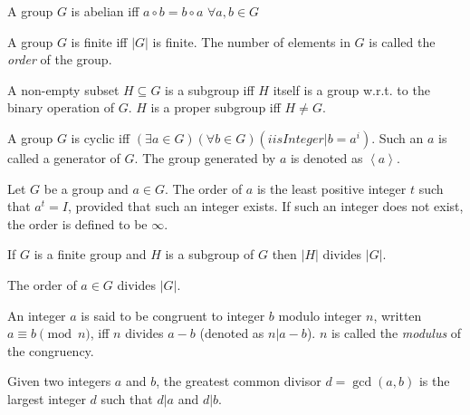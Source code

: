 \begin{defn}
  A group $G$ is abelian iff $a \circ b = b \circ a$ $\forall a,b \in G$
\end{defn}

\begin{defn}
  A group $G$ is finite iff $|G|$ is finite. The number of elements in
  $G$ is called the \emph{order} of the group.
\end{defn}

\begin{defn}[Subgroup]
  A non-empty subset $H \subseteq G$ is a subgroup iff $H$ itself is a
  group w.r.t. to the binary operation of $G$. $H$ is a proper subgroup
  iff $H \neq G$.
\end{defn}

\begin{defn}
  A group $G$ is cyclic iff $(\exists a \in G)(\forall b \in G)(i is
  Integer | b = a^i)$. Such an $a$ is called a generator of $G$. The
  group generated by $a$ is denoted as $\left< a \right>$.
\end{defn}

\begin{defn}[Order]
  Let $G$ be a group and $a \in G$. The order of $a$ is the least
  positive integer $t$ such that $a^t = I$, provided that such an
  integer exists.  If such an integer does not exist, the order is
  defined to be $\infty$.
\end{defn}

\begin{thm}
  If $G$ is a finite group and $H$ is a subgroup of $G$ then $|H|$ divides
  $|G|$.
\end{thm}

\begin{corr}
  The order of $a \in G$ divides $|G|$.
\end{corr}

\begin{defn}[Congruency]
  An integer $a$ is said to be congruent to integer $b$ modulo integer
  $n$, written $a \equiv b \pmod{n}$, iff $n$ divides $a-b$ (denoted as
  $n | a - b$). $n$ is called the \emph{modulus} of the congruency.
\end{defn}

\begin{defn}
  Given two integers $a$ and $b$, the greatest common divisor
  $d=\gcd(a,b)$ is the largest integer $d$ such that $d | a$ and $d | b$.
\end{defn}

